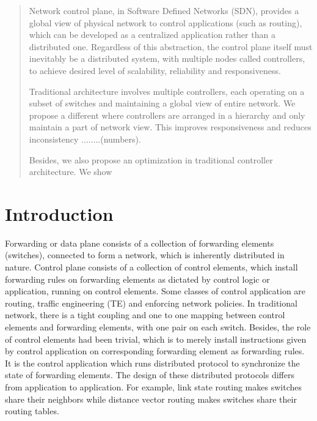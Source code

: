 \documentclass[10pt, twocolumn]{article}
\begin{document}
\maketitle
\begin{abstract}
Network control plane, in Software Defined Networks (SDN), provides a global view of physical network to control applications (such as routing), which can be developed as a centralized application rather than a distributed one. Regardless of this abstraction, the control plane itself must inevitably be a distributed system, with multiple nodes called controllers, to achieve desired level of scalability, reliability and responsiveness. 

Traditional architecture involves multiple controllers, each operating on a subset of switches and maintaining a global view of entire network. We propose a different where controllers are arranged in a hierarchy and only maintain a part of network view. This improves responsiveness and reduces inconsistency ........(numbers).

Besides, we also propose an optimization in traditional controller architecture. We show 
\end{abstract}

\section{Introduction}
Forwarding or data plane consists of a collection of forwarding elements (switches), connected to form a network, which is inherently distributed in nature. Control plane consists of a collection of control elements, which install forwarding rules on forwarding elements as dictated by control logic or application, running on control elements. Some classes of control application are routing, traffic engineering (TE) and enforcing network policies. In traditional network, there is a tight coupling and one to one mapping between control elements and forwarding elements, with one pair on each switch. Besides, the role of control elements had been trivial, which is to merely install instructions given by control application on corresponding forwarding element as forwarding rules. It is the control application which runs distributed protocol to synchronize the state of forwarding elements. The design of these distributed protocols differs from application to application. For example, link state routing makes switches share their neighbors while distance vector routing makes switches share their routing tables.
\end{document}

